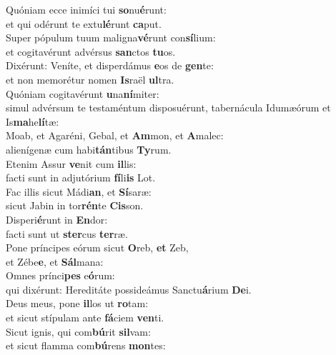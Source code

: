 \evenverse Quóniam ecce inimíci tui \textbf{so}nu\textbf{é}runt:~\*\\
\evenverse et qui odérunt te extu\textbf{lé}runt \textbf{ca}put.\\
\oddverse Super pópulum tuum maligna\textbf{vé}runt con\textbf{sí}lium:~\*\\
\oddverse et cogitavérunt advérsus \textbf{san}ctos \textbf{tu}os.\\
\evenverse Dixérunt: Veníte, et disperdámus \textbf{e}os de \textbf{gen}te:~\*\\
\evenverse et non memorétur nomen \textbf{Is}raël \textbf{ul}tra.\\
\oddverse Quóniam cogitavérunt \textbf{u}na\textbf{ní}miter:~\*\\
\oddverse simul advérsum te testaméntum disposuérunt, tabernácula Idumæórum et Is\textbf{ma}he\textbf{lí}tæ:\\
\evenverse Moab, et Agaréni, Gebal, et \textbf{Am}mon, et \textbf{A}malec:~\*\\
\evenverse alienígenæ cum habi\textbf{tán}tibus \textbf{Ty}rum.\\
\oddverse Etenim Assur \textbf{ve}nit cum \textbf{il}lis:~\*\\
\oddverse facti sunt in adjutórium \textbf{fí}li\textbf{is} Lot.\\
\evenverse Fac illis sicut Mádi\textbf{an}, et \textbf{Sí}saræ:~\*\\
\evenverse sicut Jabin in tor\textbf{rén}te \textbf{Cis}son.\\
\oddverse Disperi\textbf{é}runt in \textbf{En}dor:~\*\\
\oddverse facti sunt ut \textbf{ster}cus \textbf{ter}ræ.\\
\evenverse Pone príncipes eórum sicut \textbf{O}reb, \textbf{et} Zeb,~\*\\
\evenverse et Zébe\textbf{e}, et \textbf{Sál}mana:\\
\oddverse Omnes prínci\textbf{pes} e\textbf{ó}rum:~\*\\
\oddverse qui dixérunt: Hereditáte possideámus Sanctu\textbf{á}rium \textbf{De}i.\\
\evenverse Deus meus, pone \textbf{il}los ut \textbf{ro}tam:~\*\\
\evenverse et sicut stípulam ante \textbf{fá}ciem \textbf{ven}ti.\\
\oddverse Sicut ignis, qui com\textbf{bú}rit \textbf{sil}vam:~\*\\
\oddverse et sicut flamma com\textbf{bú}rens \textbf{mon}tes:\\
